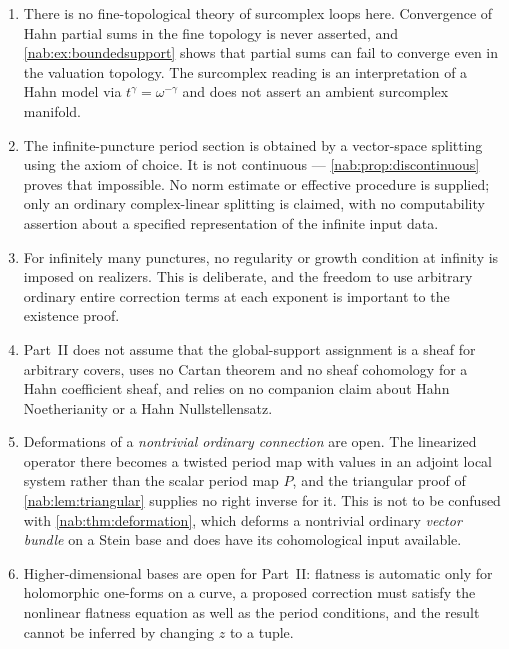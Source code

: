 \documentclass[11pt,letterpaper]{article}
\theoremstyle{definition}
\theoremstyle{remark}
\numberwithin{equation}{section}
\begin{document}
\begin{enumerate}
\item\label{nab:nc:finetop}
There is no fine-topological theory of surcomplex loops here. Convergence of
Hahn partial sums in the fine topology is never asserted, and
\cref{nab:ex:boundedsupport} shows that partial sums can fail to converge even
in the valuation topology. The surcomplex reading is an interpretation of a
Hahn model via $t^\gamma=\omega^{-\gamma}$ and does not assert an ambient
surcomplex manifold.

\item\label{nab:nc:choice}
The infinite-puncture period section is obtained by a vector-space splitting
using the axiom of choice. It is not continuous ---
\cref{nab:prop:discontinuous} proves that impossible. No norm estimate or
effective procedure is supplied; only an ordinary complex-linear splitting is
claimed, with no computability assertion about a specified representation of
the infinite input data.

\item\label{nab:nc:infinity}
For infinitely many punctures, no regularity or growth condition at infinity is
imposed on realizers. This is deliberate, and the freedom to use arbitrary
ordinary entire correction terms at each exponent is important to the existence
proof.

\item\label{nab:nc:nosheaf}
Part~II does not assume that the global-support assignment is a sheaf for
arbitrary covers, uses no Cartan theorem and no sheaf cohomology for a Hahn
coefficient sheaf, and relies on no companion claim about Hahn Noetherianity or
a Hahn Nullstellensatz.

\item\label{nab:nc:deformations}
Deformations of a \emph{nontrivial ordinary connection} are open. The
linearized operator there becomes a twisted period map with values in an
adjoint local system rather than the scalar period map $P$, and the triangular
proof of \cref{nab:lem:triangular} supplies no right inverse for it. This is
not to be confused with \cref{nab:thm:deformation}, which deforms a nontrivial
ordinary \emph{vector bundle} on a Stein base and does have its cohomological
input available.

\item\label{nab:nc:dimension}
Higher-dimensional bases are open for Part~II: flatness is automatic only for
holomorphic one-forms on a curve, a proposed correction must satisfy the
nonlinear flatness equation as well as the period conditions, and the result
cannot be inferred by changing $z$ to a tuple.


\end{enumerate}
\end{document}
